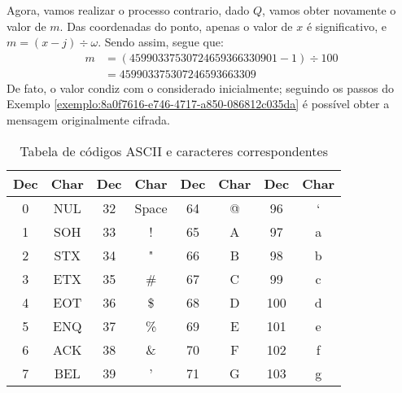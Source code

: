 Agora, vamos realizar o processo contrario, dado $Q $, vamos obter novamente o
valor de $m$. Das coordenadas do ponto, apenas o valor de $x$ é significativo,
e $m = (x - j) \div \omega$. Sendo assim, segue que:
\begin{align}
	m & = (45990337530724659366330901  - 1 ) \div 100 \nonumber \\
	  & = 459903375307246593663309\nonumber \nonumber
\end{align}
De fato, o valor condiz com o considerado inicialmente; seguindo os passos do Exemplo \ref{exemplo:8a0f7616-e746-4717-a850-086812c035da} é possível obter a mensagem originalmente cifrada.
\vspace*{0.4cm}
\begin{table}[h!]\centering

	\caption{Tabela de códigos ASCII e caracteres correspondentes} \label{table:ed73afa4-6384-4ee5-8346-9605733a7098}
	\begin{tabular}{|c|c|c|c|c|c|c|c|}
		\hline
		\textbf{Dec} & \textbf{Char} & \textbf{Dec} & \textbf{Char} & \textbf{Dec} & \textbf{Char}  & \textbf{Dec} & \textbf{Char}   \\  \hline
		0            & NUL           & 32           & Space         & 64           & @              & 96           & `               \\  \hline
		1            & SOH           & 33           & !             & 65           & A              & 97           & a               \\  \hline
		2            & STX           & 34           & "             & 66           & B              & 98           & b               \\  \hline
		3            & ETX           & 35           & \#            & 67           & C              & 99           & c               \\  \hline
		4            & EOT           & 36           & \$            & 68           & D              & 100          & d               \\  \hline
		5            & ENQ           & 37           & \%            & 69           & E              & 101          & e               \\  \hline
		6            & ACK           & 38           & \&            & 70           & F              & 102          & f               \\  \hline
		7            & BEL           & 39           & '             & 71           & G              & 103          & g               \\  \hline

\end{tabular}
\end{table}
